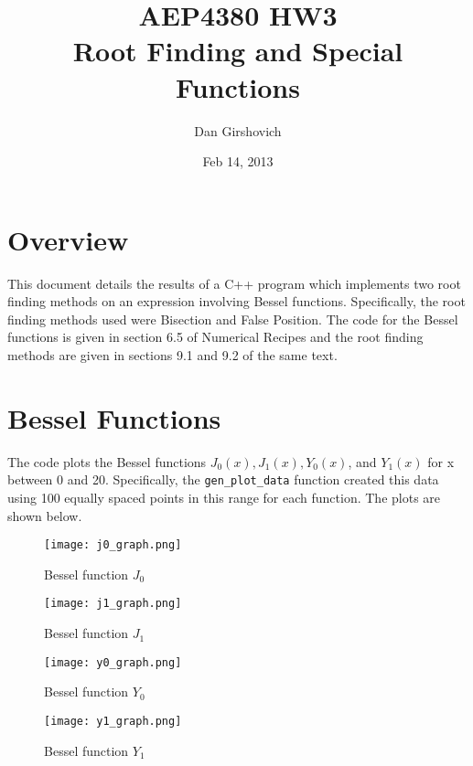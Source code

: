\documentclass[12pt]{article}
\title{AEP4380 HW3 \\ Root Finding and Special Functions}
\author{Dan Girshovich}
\date{Feb 14, 2013}
\begin{document}
\maketitle

\section{Overview}
This document details the results of a C++ program which implements two root finding methods on an expression involving Bessel functions. Specifically, the root finding methods used were Bisection and False Position. The code for the Bessel functions is given in section 6.5 of Numerical Recipes \cite{numericalrecipes} and the root finding methods are given in sections 9.1 and 9.2 of the same text.
\section{Bessel Functions}
The code plots the Bessel functions $J_0(x), J_1(x), Y_0(x)$, and $Y_1(x)$ for x between 0 and 20. Specifically, the \texttt{gen\_plot\_data} function created this data using 100 equally spaced points in this range for each function. The plots are shown below.


\begin{figure}[H]
\begin{minipage}[b]{0.45\linewidth}
\centering
\texttt{[image: j0\_graph.png]}
\caption{Bessel function $J_0$}
\label{fig:figure1}
\end{minipage}
\hspace{0.5cm}
\begin{minipage}[b]{0.45\linewidth}
\centering
\texttt{[image: j1\_graph.png]}
\caption{Bessel function $J_1$}
\label{fig:figure2}
\end{minipage}
\end{figure}

\begin{figure}[H]
\begin{minipage}[b]{0.45\linewidth}
\centering
\texttt{[image: y0\_graph.png]}
\caption{Bessel function $Y_0$}
\label{fig:figure3}
\end{minipage}
\hspace{0.5cm}
\begin{minipage}[b]{0.45\linewidth}
\centering
\texttt{[image: y1\_graph.png]}
\caption{Bessel function $Y_1$}
\label{fig:figure4}
\end{minipage}
\end{figure}
\end{document}
